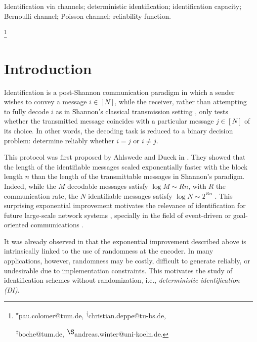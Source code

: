 \documentclass[10pt, conference]{IEEEtran}
\newcommand\blfootnote[1]{%
  \begingroup
  \renewcommand\thefootnote{}\footnote{#1}%
  \addtocounter{footnote}{-1}%
  \endgroup
}
\newcommand{\1}{\mathds{1}}
\begin{document}
\begin{IEEEkeywords}
Identification via channels;
deterministic identification;
identification capacity;
Bernoulli channel;
Poisson channel;
reliability function.
\end{IEEEkeywords}

\blfootnote{
{\textsuperscript{$\star$}pau.colomer@tum.de, \hspace{20pt} \textsuperscript{$\dagger$}christian.deppe@tu-bs.de,}\vspace{1pt}

{\textsuperscript{$\ddagger$}boche@tum.de, \hspace{45pt}\textsuperscript{$\S$}andreas.winter@uni-koeln.de.}}





\section{Introduction}
Identification is a post-Shannon communication paradigm in which a sender wishes to convey a message $i\in[N]$, while the receiver, rather than attempting to fully decode $i$ as in Shannon’s classical transmission setting \cite{Shannon:TheoryCommunication}, only tests whether the transmitted message coincides with a particular message $j\in[N]$ of its choice. In other words, the decoding task is reduced to a binary decision problem: determine reliably whether $i=j$ or $i\neq j$.

This protocol was first proposed by Ahlswede and Dueck in \cite{AD:ID_ViaChannels}. They showed that the length of the identifiable messages scaled exponentially faster with the block length $n$ than the length of the transmittable messages in Shannon's paradigm. Indeed, while the $M$ decodable messages satisfy $\log M\sim Rn$, with $R$ the communication rate, the $N$ identifiable messages satisfy $\log N\sim 2^{Rn}$ \cite{AD:ID_ViaChannels,HanVerdu:ID}. This surprising exponential improvement motivates the relevance of identification for future large-scale network systems \cite{6G_Book}, specially in the field of event-driven or goal-oriented communications \cite{Goal_Oriented_Coms}.

It was already observed in \cite{AD:ID_ViaChannels,AC:DI} that the exponential improvement described above is intrinsically linked to the use of randomness at the encoder. In many applications, however, randomness may be costly, difficult to generate reliably, or undesirable due to implementation constraints. This motivates the study of identification schemes without randomization, i.e., \emph{deterministic identification (DI)}.
\end{document}
